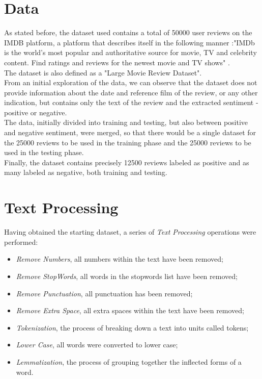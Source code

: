 \documentclass[fleqn,10pt]{SelfArx} %
\begin{document}
\section{Data}
As stated before, the dataset used contains a total of 50000 user reviews on the IMDB platform, a platform that describes itself in the following manner :"IMDb is the world's most popular and authoritative source for movie, TV and celebrity content. Find ratings and reviews for the newest movie and TV shows" \cite{IMDB}.\\
The dataset is also defined as a "Large Movie Review Dataset".\\
From an initial exploration of the data, we can observe that the dataset does not provide information about the date and reference film of the review, or any other indication, but contains only the text of the review and the extracted sentiment - positive or negative.\\
The data, initially divided into training and testing, but also between positive and negative sentiment, were merged, so that there would be a single dataset for the 25000 reviews to be used in the training phase and the 25000 reviews to be used in the testing phase.\\
Finally, the dataset contains precisely 12500 reviews labeled as positive and as many labeled as negative, both training and testing.

\section{Text Processing}
Having obtained the starting dataset, a series of \textit{Text Processing} operations were performed:
\begin{itemize}
	\item \textit{Remove Numbers}, all numbers within the text have been removed;
	\item \textit{Remove StopWords}, all words in the stopwords list have been removed;
	\item \textit{Remove Punctuation}, all punctuation has been removed;
	\item \textit{Remove Extra Space}, all extra spaces within the text have been removed;
	\item \textit{Tokenization}, the process of breaking down a text into units called tokens;
	\item \textit{Lower Case}, all words were converted to lower case;
	\item \textit{Lemmatization}, the process of grouping together the inflected forms of a word.
\end{itemize}
\end{document}
